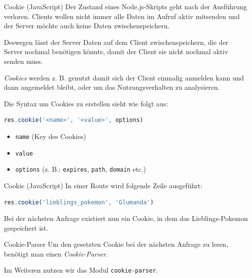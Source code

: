 \begin{defi}{Cookie (JavaScript)}
    Der Zustand eines Node.js-Skripts geht nach der Ausführung verloren.
    Clients wollen nicht immer alle Daten im Aufruf aktiv mitsenden und der Server möchte auch keine Daten zwischenspeichern.

    Deswegen lässt der Server Daten auf dem Client zwischenspeichern, die der Server nochmal benötigen könnte, damit der Client sie nicht nochmal aktiv senden muss.

    \emph{Cookies} werden z. B. genutzt damit sich der Client einmalig anmelden kann und dann angemeldet bleibt, oder um das Nutzungsverhalten zu analysieren.

    Die Syntax um Cookies zu erstellen sieht wie folgt aus:
    \begin{lstlisting}[language=JavaScript]
        res.cookie('<name>', '<value>', options)
    \end{lstlisting}

    \begin{itemize}
        \item \texttt{name} (Key des Cookies)
        \item \texttt{value}
        \item \texttt{options} (z. B.: \texttt{expires}, \texttt{path}, \texttt{domain} etc.)
    \end{itemize}
\end{defi}

\begin{example}{Cookie (JavaScript)}
    In einer Route wird folgende Zeile ausgeführt:

    \begin{lstlisting}[language=JavaScript]
        res.cookie('lieblings_pokemon', 'Glumanda')
    \end{lstlisting}

    Bei der nächsten Anfrage existiert nun ein Cookie, in dem das Lieblings-Pokemon gespeichert ist.
\end{example}

\begin{bonus}{Cookie-Parser}
    Um den gesetzten Cookie bei der nächsten Anfrage zu lesen, benötigt man einen \emph{Cookie-Parser}.

    Im Weiteren nutzen wir das Modul \texttt{cookie-parser}.
\end{bonus}

